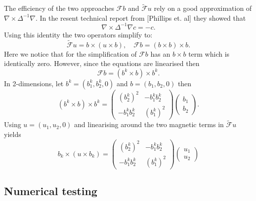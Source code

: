 \documentclass{article}
\begin{document}
The efficiency of the two approaches $\mathcal{F}b$ and $\tilde{\mathcal{F}}u$ rely on a good approximation of $\nabla \times \Delta^{-1}\nabla$. In the resent technical report from [Phillips et. al] they showed that 
$$ \nabla \times \Delta^{-1}\nabla c = -c.$$ 
Using this identity the two operators simplify to:
$$\tilde{\mathcal{F}}u = b\times(u\times b), \quad \mathcal{F}b = (b\times b)\times b.$$
Here we notice that for the simplification of $\mathcal{F}b$ has an $b\times b$ term which is identically zero. However, since the equations are linearised then 
$$\mathcal{F}b = (b^k\times b)\times b^k.$$
In 2-dimensions, let $b^k = (b_1^k,b_2^k,0)$ and $b = (b_1,b_2,0)$ then 
$$
(b^k \times b)\times b^k = 
\begin{pmatrix}
    (b_2^k)^2 & -b_1^kb_2^k\\
    -b_1^kb_2^k & (b_1^k)^2
\end{pmatrix}
\begin{pmatrix}
    b_1\\b_2
\end{pmatrix}.
$$
Using $u = (u_1,u_2,0)$ and linearising around the two magnetic terms in $\tilde{\mathcal{F}}u$ yields
$$
b_k \times (u\times b_k) = 
\begin{pmatrix}
    (b_2^k)^2 & -b_1^kb_2^k\\
    -b_1^kb_2^k & (b_1^k)^2
\end{pmatrix}
\begin{pmatrix}
    u_1\\u_2
\end{pmatrix}
$$



\subsection{Numerical testing}
\end{document}

